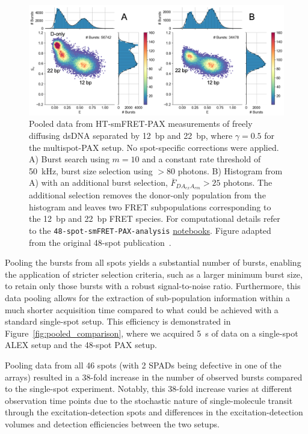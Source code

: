 \begin{figure}
\centering
\includegraphics[width=1.0\linewidth]{chapters/figures/pooled_mixed-pop.png}
\caption{\label{fig:pooled_mixed} 
Pooled data from \ac{HT-smFRET}-PAX measurements of freely diffusing dsDNA separated by 12~\ac{bp} and 22~\ac{bp}, where $\gamma= 0.5$ for the multispot-PAX setup. 
No spot-specific corrections were applied. 
A) Burst search using $m = 10$ and a constant rate threshold of 50~kHz, burst size selection using  $> 80$ photons. 
B) Histogram from A) with an additional burst selection, $\overline{F}_{DA_{ex}A_{em}} > 25$ photons. 
The additional selection removes the donor-only population from the histogram and leaves two FRET subpopulations 
corresponding to the 12~\ac{bp} and 22~\ac{bp} FRET species.
For computational details refer to the \texttt{48-spot-smFRET-PAX-analysis} \href{https://github.com/tritemio/48-spot-smFRET-PAX-analysis}{notebooks}.
Figure adapted from the original 48-spot publication~\cite{ingargiola_JCP_2018}.}
\end{figure}

Pooling the bursts from all spots yields a substantial number of bursts, enabling the application of stricter selection criteria, such as a larger minimum burst size, to retain only those bursts with a robust signal-to-noise ratio. 
Furthermore, this data pooling allows for the extraction of sub-population information within a much shorter acquisition time compared to what could be achieved with a standard single-spot setup. 
This efficiency is demonstrated in Figure~\ref{fig:pooled_comparison}, where we acquired 5~s of data on a single-spot \ac{ALEX} setup and the 48-spot \ac{PAX} setup.

Pooling data from all 46 spots (with 2 \ac{SPAD}s being defective in one of the arrays) resulted in a 38-fold increase in the number of observed bursts compared to the single-spot experiment. 
Notably, this 38-fold increase varies at different observation time points due to the stochastic nature of single-molecule transit through the excitation-detection spots and differences in the excitation-detection volumes and detection efficiencies between the two setups.

